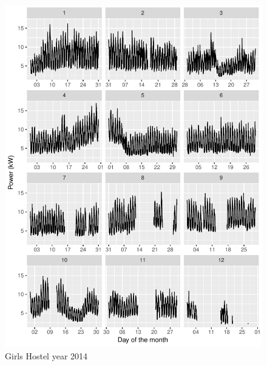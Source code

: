 \documentclass[11pt, oneside]{article}   	%
\begin{document}
\begin{figure}
\includegraphics[keepaspectratio]{girls_hostel_year2014.pdf}
\caption{Girls Hostel year 2014}
\end{figure}
\end{document}
